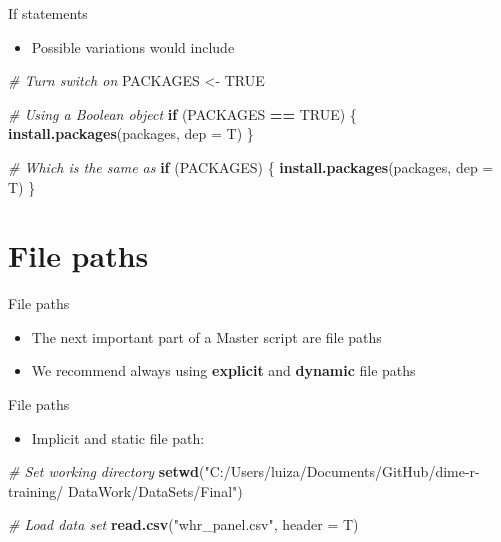 \documentclass[ignorenonframetext,]{beamer}
\newenvironment{Shaded}{\begin{snugshade}}{\end{snugshade}}
\newcommand{\KeywordTok}[1]{\textcolor[rgb]{0.13,0.29,0.53}{\textbf{#1}}}
\newcommand{\DataTypeTok}[1]{\textcolor[rgb]{0.13,0.29,0.53}{#1}}
\newcommand{\StringTok}[1]{\textcolor[rgb]{0.31,0.60,0.02}{#1}}
\newcommand{\CommentTok}[1]{\textcolor[rgb]{0.56,0.35,0.01}{\textit{#1}}}
\newcommand{\OtherTok}[1]{\textcolor[rgb]{0.56,0.35,0.01}{#1}}
\newcommand{\ControlFlowTok}[1]{\textcolor[rgb]{0.13,0.29,0.53}{\textbf{#1}}}
\newcommand{\OperatorTok}[1]{\textcolor[rgb]{0.81,0.36,0.00}{\textbf{#1}}}
\newcommand{\NormalTok}[1]{#1}
\providecommand{\tightlist}{%
  \setlength{\itemsep}{0pt}\setlength{\parskip}{0pt}}
\begin{document}
\begin{frame}[fragile]{If statements}

\begin{itemize}
\tightlist
\item
  Possible variations would include
\end{itemize}

\begin{Shaded}
\begin{Highlighting}[]
    \CommentTok{# Turn switch on}
\NormalTok{    PACKAGES <-}\StringTok{ }\OtherTok{TRUE}

    \CommentTok{# Using a Boolean object}
    \ControlFlowTok{if}\NormalTok{ (PACKAGES }\OperatorTok{==}\StringTok{ }\OtherTok{TRUE}\NormalTok{) \{}
      \KeywordTok{install.packages}\NormalTok{(packages, }\DataTypeTok{dep =}\NormalTok{ T)}
\NormalTok{    \}}

    \CommentTok{# Which is the same as}
    \ControlFlowTok{if}\NormalTok{ (PACKAGES) \{}
      \KeywordTok{install.packages}\NormalTok{(packages, }\DataTypeTok{dep =}\NormalTok{ T)}
\NormalTok{    \}}
\end{Highlighting}
\end{Shaded}

\end{frame}

\section{File paths}\label{file-paths}

\begin{frame}{File paths}

\begin{itemize}
\tightlist
\item
  The next important part of a Master script are file paths
\item
  We recommend always using \textbf{explicit} and \textbf{dynamic} file
  paths
\end{itemize}

\end{frame}

\begin{frame}[fragile]{File paths}

\begin{itemize}
\tightlist
\item
  Implicit and static file path:
\end{itemize}

\begin{Shaded}
\begin{Highlighting}[]
  \CommentTok{# Set working directory}
  \KeywordTok{setwd}\NormalTok{(}\StringTok{"C:/Users/luiza/Documents/GitHub/dime-r-training/}
\StringTok{        DataWork/DataSets/Final"}\NormalTok{)}
  
  \CommentTok{# Load data set}
  \KeywordTok{read.csv}\NormalTok{(}\StringTok{"whr_panel.csv"}\NormalTok{,}
            \DataTypeTok{header =}\NormalTok{ T)}
\end{Highlighting}
\end{Shaded}

\end{frame}
\end{document}
